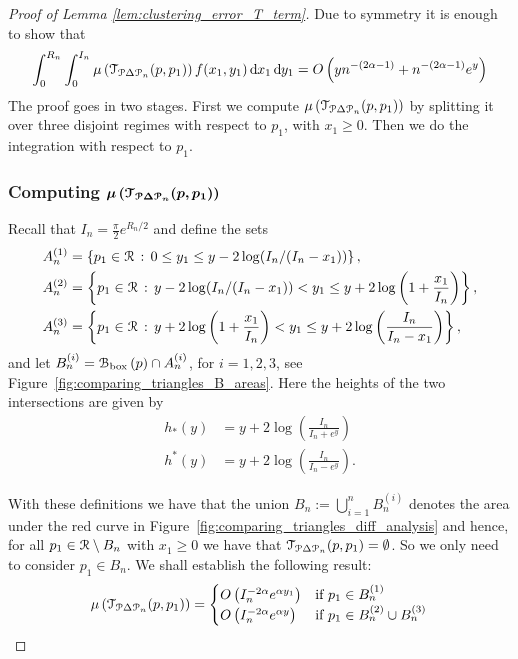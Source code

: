 \begin{proof}[Proof of Lemma \ref{lem:clustering_error_T_term}]
Due to symmetry it is enough to show that
\begin{equation}\label{eq:clustering_error_T_main}
	\int_0^{R_n}\int_0^{I_n} \mu\left(\mathcal{T}_{{\mathcal P} \Delta {\mathcal P}_n}(p,p_1)\right) f(x_1,y_1) 
	\operatorname{\mathrm{d}\hspace{-2pt}} x_1 \operatorname{\mathrm{d}\hspace{-2pt}} y_1 = O\left(y n^{-(2\alpha - 1)} + n^{-(2\alpha-1)} e^{y}\right)
\end{equation}
The proof goes in two stages. First we compute $\mu\left(\mathcal{T}_{{\mathcal P} \Delta {\mathcal P}_n}(p,p_1)\right)$ by splitting it over three disjoint regimes with respect to $p_1$, with $x_1 \ge 0$. Then we do the integration with respect to $p_1$.

\subsubsection*{Computing $\bm{\mu\left(\mathcal{T}_{{\mathcal P} \Delta {\mathcal P}_n}(p,p_1)\right)}$}

Recall that $I_n = \frac{\pi}{2} e^{R_n/2}$ and define the sets
\begin{align*}
	A_n^{(1)} &= \left\{p_1 \in {\mathcal R} \, : \, 0 \le y_1 \le y - 2\log(I_n/(I_n-x_1)) \right\},\\
	A_n^{(2)} &= \left\{p_1 \in {\mathcal R} \, : \, y - 2\log(I_n/(I_n-x_1)) < y_1 
		\le y + 2 \log\left(1 + \frac{x_1}{I_n}\right)\right\},\\
	A_n^{(3)} &= \left\{p_1 \in {\mathcal R} \, : \, y + 2 \log\left(1 + \frac{x_1}{I_n}\right) < y_1 
			\le y + 2 \log\left(\frac{I_n}{I_n-x_1}\right)\right\},
\end{align*}
and let $B_n^{(i)} = {\mathcal B}_{\text{box}}\left(p\right) \cap A_n^{(i)}$, for $i = 1, 2, 3$, see Figure~\ref{fig:comparing_triangles_B_areas}. Here the heights of the two intersections are given by
\begin{align}
	h_\ast(y) &= y + 2 \log\left(\frac{I_n}{I_n + e^y}\right)\\
	h^\ast(y) &= y + 2 \log\left(\frac{I_n}{I_n - e^y}\right).
\end{align}

With these definitions we have that the union $B_n := \bigcup_{i = 1}^n B_n^{(i)}$ denotes the area under the red curve in Figure~\ref{fig:comparing_triangles_diff_analysis} and hence, for all $p_1 \in {\mathcal R}\setminus B_n$ with $x_1 \ge 0$ we have that $\mathcal{T}_{{\mathcal P} \Delta {\mathcal P}_n}(p,p_1) = \emptyset$. So we only need to consider $p_1 \in B_n$. We shall establish the following result:
\begin{equation}\label{eq:mu_triangle_diff}
	\mu\left(\mathcal{T}_{{\mathcal P} \Delta {\mathcal P}_n}(p,p_1)\right) = 
	\begin{cases}
		O\left(I_n^{-2\alpha} e^{\alpha y_1}\right) &\mbox{if } p_1 \in B_n^{(1)}\\
		O\left(I_n^{-2\alpha} e^{\alpha y}\right) &\mbox{if } p_1 \in B_n^{(2)} \cup B_n^{(3)}
	\end{cases}
\end{equation}


\end{proof}
